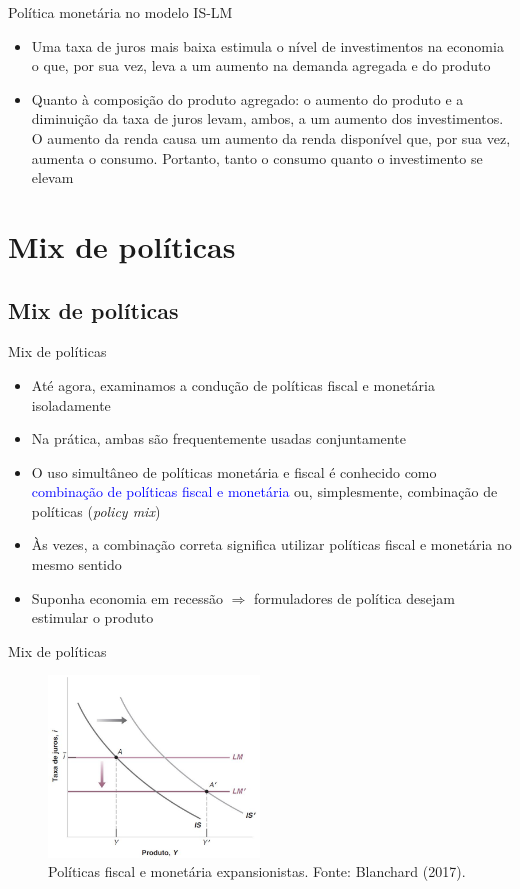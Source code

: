 \documentclass[10pt]{beamer}
\begin{document}
\begin{frame}{Política monetária no modelo IS-LM}
\begin{itemize}
    \item Uma taxa de juros mais baixa estimula o nível de investimentos na economia o que, por sua vez, leva a um aumento na demanda agregada e do produto
    \bigskip
    \item Quanto à composição do produto agregado: o aumento do produto e a diminuição da taxa de juros levam, ambos, a um aumento dos investimentos. O aumento da renda causa um aumento da renda disponível que, por sua vez, aumenta o consumo. Portanto, tanto o consumo quanto o investimento se elevam
\end{itemize}
\end{frame}

\section{Mix de políticas}
\subsection{Mix de políticas}
\begin{frame}{Mix de políticas}
    \begin{itemize}
        \item Até agora, examinamos a condução de políticas fiscal e monetária isoladamente
        \bigskip
        \item Na prática, ambas são frequentemente usadas conjuntamente
        \bigskip
        \item O uso simultâneo de políticas monetária e fiscal é conhecido como \textcolor{blue}{combinação de políticas fiscal e monetária} ou, simplesmente, combinação de políticas (\emph{policy mix})
        \bigskip
        \item Às vezes, a combinação correta significa utilizar políticas fiscal e monetária no mesmo sentido
        \bigskip
        \item Suponha economia em recessão $\Rightarrow$ formuladores de política desejam estimular o produto
    \end{itemize}
\end{frame}

\begin{frame}{Mix de políticas}
\begin{figure}
    \centering
    \includegraphics[width=0.5\textwidth]{./figures/aula082_fig7.JPG}
    \caption{Políticas fiscal e monetária expansionistas. Fonte: Blanchard (2017).}
    \label{fig1}
\end{figure}
\end{frame}
\end{document}
